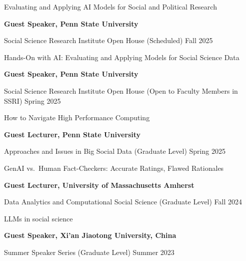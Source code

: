\documentclass[10.5pt,]{article}
\providecommand{\tightlist}{%
	\setlength{\itemsep}{0pt}\setlength{\parskip}{0pt}}
\renewenvironment{itemize}{
	\begin{list}{}{
			\setlength{\leftmargin}{1.5em}
		}
	}{
	\end{list}
}
\begin{document}
\begin{itemize}
\begin{itemize}
    \begin{itemize}
    \tightlist
    \item
      Evaluating and Applying AI Models for Social and Political
      Research
    \end{itemize}
  \item
    \textbf{Guest Speaker, Penn State University}
  \item
    Social Science Research Institute Open House (Scheduled) \hfill Fall
    2025

    \begin{itemize}
    \tightlist
    \item
      Hands-On with AI: Evaluating and Applying Models for Social
      Science Data
    \end{itemize}
  \item
    \textbf{Guest Speaker, Penn State University}
  \item
    Social Science Research Institute Open House (Open to Faculty
    Members in SSRI) \hfill Spring 2025

    \begin{itemize}
    \tightlist
    \item
      How to Navigate High Performance Computing
    \end{itemize}
  \item
    \textbf{Guest Lecturer, Penn State University}
  \item
    Approaches and Issues in Big Social Data (Graduate Level)
    \hfill Spring 2025

    \begin{itemize}
    \tightlist
    \item
      GenAI vs.~Human Fact-Checkers: Accurate Ratings, Flawed Rationales
    \end{itemize}
  \item
    \textbf{Guest Lecturer, University of Massachusetts Amherst}
  \item
    Data Analytics and Computational Social Science (Graduate Level)
    \hfill Fall 2024

    \begin{itemize}
    \tightlist
    \item
      LLMs in social science
    \end{itemize}
  \item
    \textbf{Guest Speaker, Xi'an Jiaotong University, China}
  \item
    Summer Speaker Series (Graduate Level) \hfill Summer 2023


\end{itemize}
\end{itemize}
\end{document}
